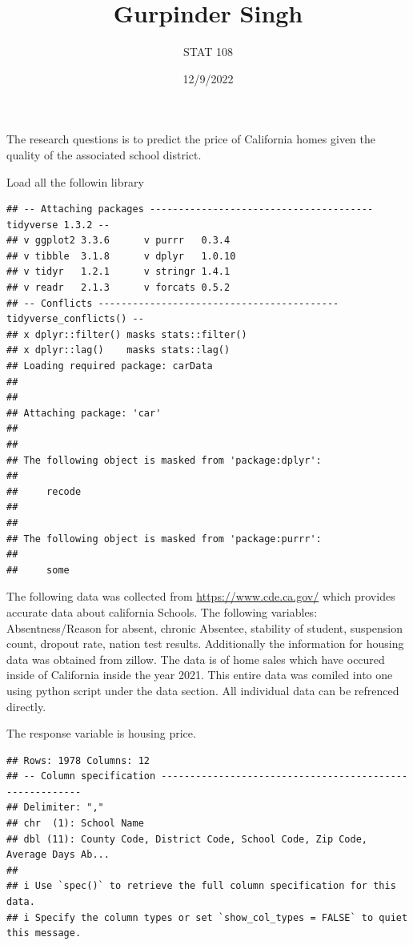 \documentclass[
]{article}
\title{Gurpinder Singh}
\author{STAT 108}
\date{12/9/2022}
\begin{document}
\maketitle

The research questions is to predict the price of California homes given
the quality of the associated school district.

Load all the followin library

\begin{verbatim}
## -- Attaching packages --------------------------------------- tidyverse 1.3.2 --
## v ggplot2 3.3.6      v purrr   0.3.4 
## v tibble  3.1.8      v dplyr   1.0.10
## v tidyr   1.2.1      v stringr 1.4.1 
## v readr   2.1.3      v forcats 0.5.2 
## -- Conflicts ------------------------------------------ tidyverse_conflicts() --
## x dplyr::filter() masks stats::filter()
## x dplyr::lag()    masks stats::lag()
## Loading required package: carData
## 
## 
## Attaching package: 'car'
## 
## 
## The following object is masked from 'package:dplyr':
## 
##     recode
## 
## 
## The following object is masked from 'package:purrr':
## 
##     some
\end{verbatim}

The following data was collected from \url{https://www.cde.ca.gov/}
which provides accurate data about california Schools. The following
variables: Absentness/Reason for absent, chronic Absentee, stability of
student, suspension count, dropout rate, nation test results.
Additionally the information for housing data was obtained from zillow.
The data is of home sales which have occured inside of California inside
the year 2021. This entire data was comiled into one using python script
under the data section. All individual data can be refrenced directly.

The response variable is housing price.

\begin{verbatim}
## Rows: 1978 Columns: 12
## -- Column specification --------------------------------------------------------
## Delimiter: ","
## chr  (1): School Name
## dbl (11): County Code, District Code, School Code, Zip Code, Average Days Ab...
## 
## i Use `spec()` to retrieve the full column specification for this data.
## i Specify the column types or set `show_col_types = FALSE` to quiet this message.
\end{verbatim}
\end{document}
